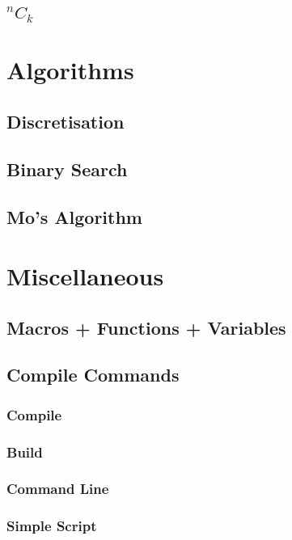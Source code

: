 \documentclass{article}
\begin{document}
\subsection{\texorpdfstring{$^{n}C_{k}$}{}}


\section{Algorithms}
\subsection{Discretisation}

\subsection{Binary Search}

\subsection{Mo's Algorithm}


\section{Miscellaneous}
\subsection{Macros + Functions + Variables}


\subsection{Compile Commands}
\subsubsection{Compile}

\subsubsection{Build}

\subsubsection{Command Line}

\subsubsection{Simple Script}

\end{document}
